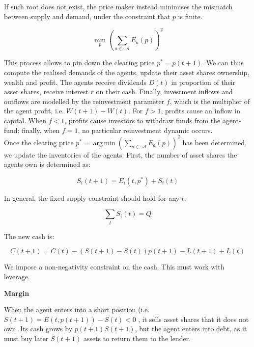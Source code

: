 \documentclass{article}
\DeclareMathOperator*{\argmin}{arg\,min}
\begin{document}
If such root does not exist, the price maker instead minimises the mismatch between supply and demand, under the constraint that $p$ is finite.

\begin{equation}
\label{market_clearing_mismatch}
\min_p\left(\sum_{a \in, \mathcal{A}} E_{a}(p)\right)^{2}
\end{equation}

This process allows to pin down the clearing price $p^* = p(t+1)$. We can thus compute the realised demands of the agents, update their asset shares ownership, wealth and profit. The agents receive dividends $D(t)$ in proportion of their asset shares, receive interest $r$ on their cash. Finally, investment inflows and outflows are modelled by the reinvestment parameter $f$, which is the multiplier of the agent profit, i.e. $W(t+1) - W(t)$. For $f > 1$, profits cause an inflow in capital. When $f < 1$, profits cause investors to withdraw funds from the agent-fund; finally, when $f=1$, no particular reinvestment dynamic occurs. \\

Once the clearing price $p^* = \argmin \left(\sum_{a \in, \mathcal{A}} E_{a}(p)\right)^{2} $ has been determined, we update the inventories of the agents.
First, the number of asset shares the agents own is determined as:

\begin{equation}
    S_i(t+1) = E_i(t, p^*) + S_i(t)
\end{equation}

In general, the fixed supply constraint should hold for any $t$:

\begin{equation}
    \sum_i S_i(t) = Q
\end{equation}

The new cash is:

\begin{equation}
    C(t+1) = C(t) - (S(t+1) - S(t))p(t+1) - L(t+1) + L(t)
\end{equation}

We impose a non-negativity constraint on the cash. 
This must work with leverage.

\textbf{Margin}

When the agent enters into a short position (i.e. $S(t+1) = E(t,p(t+1)) - S(t) < 0$ , it sells asset shares that it does not own. Its cash grows by $p(t+1)S(t+1)$, but the agent enters into debt, as it must buy later $S(t+1)$ assets to return them to the lender.
\end{document}
